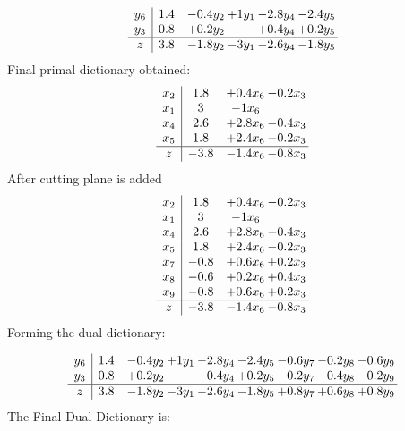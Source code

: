\documentclass[11pt]{article}
\begin{document}
\[\begin{array}{c| c c@{\hskip 2pt} c@{\hskip 2pt} c@{\hskip 2pt} c@{\hskip 2pt} }
 y_{6}   &  1.4 & -0.4 y_{2} & + 1 y_{1} & -2.8 y_{4} & -2.4 y_{5}\\
 y_{3}   &  0.8 & + 0.2 y_{2} &   & + 0.4 y_{4} & + 0.2 y_{5}\\
\hline
z    &  3.8 & -1.8 y_{2} & -3 y_{1} & -2.6 y_{4} & -1.8 y_{5}\\
\end{array}\]
 Final primal dictionary obtained: 
\[\begin{array}{c| c c@{\hskip 2pt} c@{\hskip 2pt} }
 x_{2}   &  1.8 & + 0.4 x_{6} & -0.2 x_{3}\\
 x_{1}   &  3 & -1 x_{6} &   \\
 x_{4}   &  2.6 & + 2.8 x_{6} & -0.4 x_{3}\\
 x_{5}   &  1.8 & + 2.4 x_{6} & -0.2 x_{3}\\
\hline
z    &  -3.8 & -1.4 x_{6} & -0.8 x_{3}\\
\end{array}\]
 After cutting plane is added 
\[\begin{array}{c| c c@{\hskip 2pt} c@{\hskip 2pt} }
 x_{2}   &  1.8 & + 0.4 x_{6} & -0.2 x_{3}\\
 x_{1}   &  3 & -1 x_{6} &   \\
 x_{4}   &  2.6 & + 2.8 x_{6} & -0.4 x_{3}\\
 x_{5}   &  1.8 & + 2.4 x_{6} & -0.2 x_{3}\\
 x_{7}   &  -0.8 & + 0.6 x_{6} & + 0.2 x_{3}\\
 x_{8}   &  -0.6 & + 0.2 x_{6} & + 0.4 x_{3}\\
 x_{9}   &  -0.8 & + 0.6 x_{6} & + 0.2 x_{3}\\
\hline
z    &  -3.8 & -1.4 x_{6} & -0.8 x_{3}\\
\end{array}\]
Forming the dual dictionary:

\[\begin{array}{c| c c@{\hskip 2pt} c@{\hskip 2pt} c@{\hskip 2pt} c@{\hskip 2pt} c@{\hskip 2pt} c@{\hskip 2pt} c@{\hskip 2pt} }
 y_{6}   &  1.4 & -0.4 y_{2} & + 1 y_{1} & -2.8 y_{4} & -2.4 y_{5} & -0.6 y_{7} & -0.2 y_{8} & -0.6 y_{9}\\
 y_{3}   &  0.8 & + 0.2 y_{2} &   & + 0.4 y_{4} & + 0.2 y_{5} & -0.2 y_{7} & -0.4 y_{8} & -0.2 y_{9}\\
\hline
z    &  3.8 & -1.8 y_{2} & -3 y_{1} & -2.6 y_{4} & -1.8 y_{5} & + 0.8 y_{7} & + 0.6 y_{8} & + 0.8 y_{9}\\
\end{array}\]
The Final Dual Dictionary is: 
\end{document}
